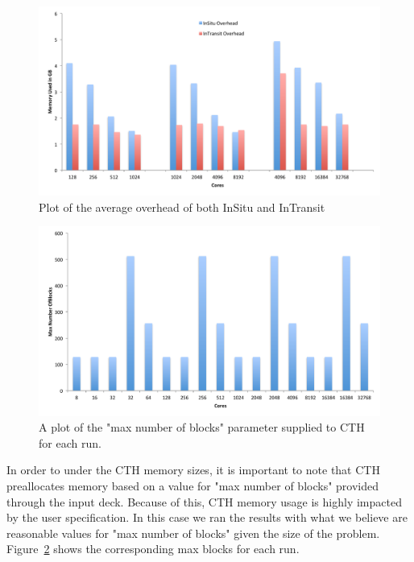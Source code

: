 \begin{figure}[htb]
  \centering
  \includegraphics[width=\linewidth]{figures/MemoryUsageCompare.pdf}
  \caption{Plot of the average overhead of both InSitu and InTransit}
  \label{fig:MemoryCompare}
\end{figure}

\begin{figure}[htb]
  \centering
  \includegraphics[width=\linewidth]{figures/MaxNumberOfBlocks.pdf}
  \caption{A plot of the "max number of blocks" parameter supplied to CTH for each run.}
  \label{fig:MaxBlocks}
\end{figure}

In order to under the CTH memory sizes, it is important to note that CTH
preallocates memory based on a value for "max number of blocks" provided
through the input deck.  Because of this, CTH memory usage is highly impacted
by the user specification.  In this case we ran the results with what we
believe are reasonable values for "max number of blocks" given the size of the
problem.  Figure~\ref{fig:MaxBlocks} shows the corresponding max blocks for
each run.


